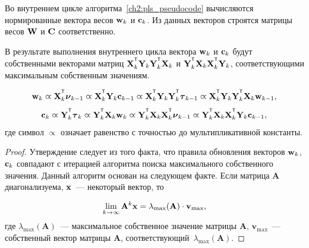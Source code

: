Во внутреннем цикле алгоритма~\ref{ch2:pls_pseudocode} вычисляются нормированные вектора весов $\mathbf{w}_k$ и $\mathbf{c}_k$. 
Из данных векторов строятся матрицы весов $\mathbf{W}$ и $\mathbf{C}$ соответственно.

\begin{statement}
	В результате выполнения внутреннего цикла вектора $\mathbf{w}_k$ и $\mathbf{c}_k$ будут собственными векторами матриц $\bX_k^{\T} \bY_k \bY_k^{\T} \bX_k$ и $\bY_k^{\T} \bX_k \bX_k^{\T} \bY_k$, соответствующими максимальным собственным значениям.
	
	\begin{equation*}
		\bw_k \varpropto \bX_k^{\T} \bnu_{k-1} \varpropto \bX_k^{\T} \bY_k \bc_{k-1} \varpropto \bX_k^{\T} \bY_k \bY_k^{\T} \btau_{k-1} \varpropto \bX_k^{\T} \bY_k \bY_k^{\T} \bX_k \bw_{k-1},
	\end{equation*}
	\begin{equation*}
		\bc_k \varpropto \bY_k^{\T} \btau_k \varpropto \bY_k^{\T} \bX_k \bw_k \varpropto \bY_k^{\T} \bX_k \bX_k^{\T} \bnu_{k-1} \varpropto \bY_k^{\T} \bX_k \bX_k^{\T} \bY_k \bc_{k-1},
	\end{equation*}
	где символ $\varpropto$ означает равенство с точностью до мультипликативной константы. 
	\label{ch2:stat:eig}
\end{statement}
\begin{proof}
	Утверждение следует из того факта, что правила обновления векторов $\mathbf{w}_k$, $\mathbf{c}_k$ совпадают с итерацией алгоритма поиска максимального собственного значения. 
	Данный алгоритм основан на следующем факте.
	Если матрица $\mathbf{A}$ диагонализуема, $\mathbf{x}$~--- некоторый вектор, то
	
	\[
	\lim_{k \rightarrow \infty} \mathbf{A}^k \mathbf{x} = \lambda_{\max}(\mathbf{A}) \cdot \mathbf{v}_{\max},
	\]
	где $ \lambda_{\max} (\mathbf{A})$~--- максимальное собственное значение матрицы $\mathbf{A}$, $\mathbf{v}_{\max}$~--- собственный вектор матрицы $\mathbf{A}$, соответствующий~$\lambda_{\max} (\mathbf{A})$.
	
\end{proof}

